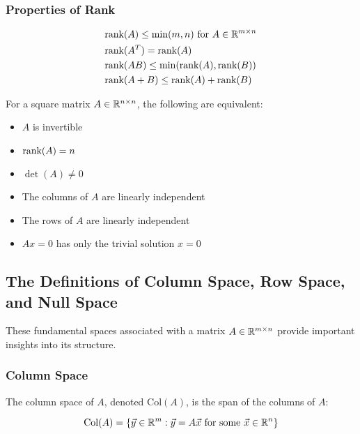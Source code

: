 \subsubsection{Properties of Rank}

\begin{align*}
    &\text{rank}(A) \leq \min(m,n) \text{ for } A \in \mathbb{R}^{m \times n} \\
    &\text{rank}(A^T) = \text{rank}(A) \\
    &\text{rank}(AB) \leq \min(\text{rank}(A), \text{rank}(B)) \\
    &\text{rank}(A+B) \leq \text{rank}(A) + \text{rank}(B)
\end{align*}

For a square matrix \(A \in \mathbb{R}^{n \times n}\), the following are equivalent:

\begin{itemize}

    \item \(A\) is invertible

    \item \(\text{rank}(A) = n\)

    \item \(\det(A) \neq 0\)

    \item The columns of \(A\) are linearly independent

    \item The rows of \(A\) are linearly independent

    \item \(Ax = 0\) has only the trivial solution \(x = 0\)

\end{itemize}

\subsection{The Definitions of Column Space, Row Space, and Null Space}

These fundamental spaces associated with a matrix \(A \in \mathbb{R}^{m \times n}\) provide important insights into its structure.

\subsubsection{Column Space}

The column space of \(A\), denoted \(\text{Col}(A)\), is the span of the columns of \(A\):

\[
    \text{Col}(A) = \{\vec{y} \in \mathbb{R}^m : \vec{y} = A\vec{x} \text{ for some } \vec{x} \in \mathbb{R}^n\}
\]

